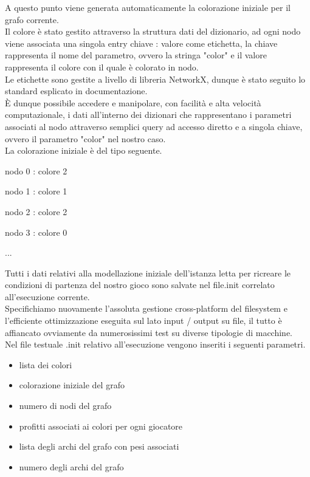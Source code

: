 A questo punto viene generata automaticamente la colorazione iniziale per il grafo corrente.\\
Il colore è stato gestito attraverso la struttura dati del dizionario, ad ogni nodo viene associata una singola entry chiave : valore come etichetta, la chiave rappresenta il nome del parametro, ovvero la stringa "color" e il valore rappresenta il colore con il quale è colorato in nodo.\\
Le etichette sono gestite a livello di libreria NetworkX, dunque è stato seguito lo standard esplicato in documentazione.\\
È dunque possibile accedere e manipolare, con facilità e alta velocità computazionale, i dati all'interno dei dizionari che rappresentano i parametri associati al nodo attraverso semplici query ad accesso diretto e a singola chiave, ovvero il parametro "color" nel nostro caso.\\
La colorazione iniziale è del tipo seguente.

\begin{description}
	\item nodo 0 : colore 2
	\item nodo 1 : colore 1
	\item nodo 2 : colore 2
	\item nodo 3 : colore 0
	\item ...
\end{description}

Tutti i dati relativi alla modellazione iniziale dell'istanza letta per ricreare le condizioni di partenza del nostro gioco sono salvate nel file.init correlato all'esecuzione corrente.\\
Specifichiamo nuovamente l'assoluta gestione cross-platform del filesystem e l'efficiente ottimizzazione eseguita sul lato input / output su file, il tutto è affiancato ovviamente da numerosissimi test su diverse tipologie di macchine.\\

Nel file testuale .init relativo all'esecuzione vengono inseriti i seguenti parametri.

\begin{itemize}
	\item lista dei colori
	\item colorazione iniziale del grafo
	\item numero di nodi del grafo
	\item profitti associati ai colori per ogni giocatore
	\item lista degli archi del grafo con pesi associati
	\item numero degli archi del grafo
\end{itemize}

